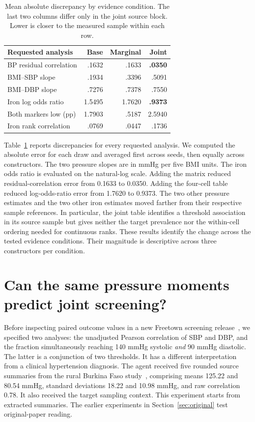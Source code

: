 \documentclass[sigconf,anonymous,review]{acmart}
\begin{document}
\begin{table}[t]
\caption{Mean absolute discrepancy by evidence condition. The last two columns differ only in the joint source block. Lower is closer to the measured sample within each row.}
\label{tab:evidence}
\centering
\begin{tabular}{@{}lrrr@{}}
\toprule
Requested analysis & Base & Marginal & Joint\\
\midrule
BP residual correlation & .1632 & .1633 & \textbf{.0350}\\
BMI--SBP slope & .1934 & .3396 & .5091\\
BMI--DBP slope & .7276 & .7378 & .7550\\
Iron log odds ratio & 1.5495 & 1.7620 & \textbf{.9373}\\
Both markers low (pp) & 1.7903 & .5187 & 2.5940\\
Iron rank correlation & .0769 & .0447 & .1736\\
\bottomrule
\end{tabular}
\end{table}

Table~\ref{tab:evidence} reports discrepancies for every requested analysis. We computed the absolute error for each draw and averaged first across seeds, then equally across constructors. The two pressure slopes are in mmHg per five BMI units. The iron odds ratio is evaluated on the natural-log scale. Adding the matrix reduced residual-correlation error from 0.1633 to 0.0350. Adding the four-cell table reduced log-odds-ratio error from 1.7620 to 0.9373. The two other pressure estimates and the two other iron estimates moved farther from their respective sample references. In particular, the joint table identifies a threshold association in its source sample but gives neither the target prevalence nor the within-cell ordering needed for continuous ranks. These results identify the change across the tested evidence conditions. Their magnitude is descriptive across three constructors per condition.

\section{Can the same pressure moments predict joint screening?}
\label{sec:prospective}
Before inspecting paired outcome values in a new Freetown screening release~\cite{freetown,freetowndata}, we specified two analyses: the unadjusted Pearson correlation of SBP and DBP, and the fraction simultaneously reaching 140 mmHg systolic \emph{and} 90 mmHg diastolic. The latter is a conjunction of two thresholds. It has a different interpretation from a clinical hypertension diagnosis. The agent received five rounded source summaries from the rural Burkina Faso study~\cite{jaspert}, comprising means 125.22 and 80.54 mmHg, standard deviations 18.22 and 10.98 mmHg, and raw correlation 0.78. It also received the target sampling context. This experiment starts from extracted summaries. The earlier experiments in Section~\ref{sec:original} test original-paper reading.
\end{document}
